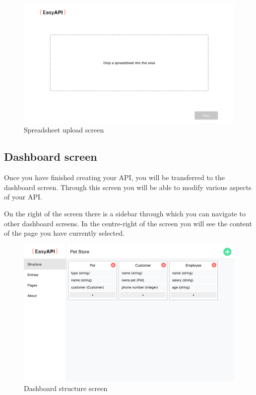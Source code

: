 \begin{figure}
\label{sheet}
\centerline{\includegraphics[scale=0.4]{screenshots/sheet.png}}
\caption{Spreadsheet upload screen}
\end{figure}




\subsection{Dashboard screen}
Once you have finished creating your API, you will be transferred to the dashboard screen. Through this screen you will be able to modify various aspects of your API.

On the right of the screen there is a sidebar through which you can navigate to other dashboard screens. In the centre-right of the screen you will see the content of the page you have currently selected.


\begin{figure}
\label{structure img}
\centerline{\includegraphics[scale=0.4]{screenshots/structure.png}}
\caption{Dashboard structure screen}
\end{figure}




